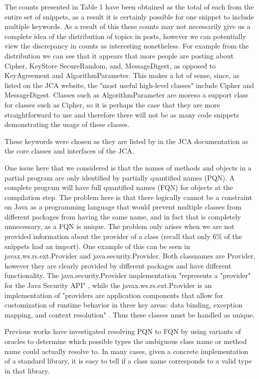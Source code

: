\documentclass[10pt, conference]{IEEEtran}
\begin{document}
The counts presented in Table 1 have been obtained as the total of each from the entire set of snippets, as a result it is certainly possible for one snippet to include multiple keywords. As a result of this these counts may not necessarily give us a complete idea of the distribution of topics in posts, however we can potentially view the discrepancy in counts as interesting nonetheless. For example from the distribution we can see that it appears that more people are posting about Cipher, KeyStore SecureRandom, and, MessageDigest, as opposed to KeyAgreement and AlgorithmParameter. This makes a lot of sense, since, as listed on the JCA website, the "most useful high-level classes" include Cipher and MessageDigest. Classes such as AlgorithmParameter are moreso a support class for classes such as Cipher, so it is perhaps the case that they are more straightforward to use and therefore there will not be as many code snippets demonstrating the usage of these classes.
 
These keywords were chosen as they are listed by in the JCA documentation \cite{JCA} as the core classes and interfaces of the JCA.

One issue here that we considered is that the names of methods and objects in a partial program are only identified by partially quantified names (PQN). A complete program will have full quantified names (FQN) for objects at the compilation step. The problem here is that there logically cannot be a constraint on Java as a programming language that would prevent multiple classes from different packages from having the same name, and in fact that is completely unnecessary, as a FQN is unique. The problem only arises when we are not provided information about the provider of a class (recall that only 6\% of the snippets had an import). One example of this can be seen in javax.ws.rs.ext.Provider and java.security.Provider. Both classnames are Provider, however they are clearly provided by different packages and have different functionality. The java.security.Provider implementation "represents a "provider" for the Java Security API" \cite{Security.Provider}, while the javax.ws.rs.ext.Provider is an implementation of "providers are application components that allow for customization of runtime behavior in three key areas: data binding, exception mapping, and context resolution" \cite{jax.Provider}. Thus these classes must be handled as unique.

Previous works \cite{} have investigated resolving PQN to FQN by using variants of oracles to determine which possible types the ambiguous class name or method name could actually resolve to. In many cases, given a concrete implementation of a standard library, it is easy to tell if a class name corresponds to a valid type in that library. 
\end{document}
